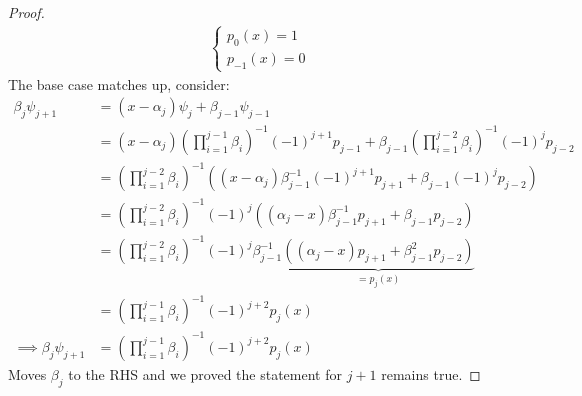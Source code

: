 \documentclass[]{article}
\theoremstyle{definition}
\begin{document}
\begin{appendices}
\begin{proof}
\begin{align}
\begin{cases}
                        p_0(x) = 1 
                        \\
                        p_{-1}(x) = 0
                    \end{cases}
                \end{align}
                The base case matches up, consider: 
                \begin{align}
                    \beta_j\psi_{j + 1} &= (x - \alpha_j)\psi_j + \beta_{j - 1}\psi_{j - 1}
                    \\
                    &= (x - \alpha_j)\left(
                        \prod_{i = 1}^{j - 1}\beta_i
                    \right)^{-1}(-1)^{j + 1}p_{j - 1}
                    + 
                    \beta_{j - 1}\left(
                        \prod_{i = 1}^{j - 2}\beta_i
                    \right)^{-1}(-1)^{j}p_{j - 2}
                    \\
                    &= 
                    \left(
                        \prod_{i = 1}^{j - 2}\beta_i
                    \right)^{-1}
                    \left(
                        (x - \alpha_j)\beta_{j - 1}^{-1}(-1)^{j + 1}p_{j + 1}
                        + 
                        \beta_{j - 1}(-1)^jp_{j -2}
                    \right)
                    \\
                    &= 
                    \left(
                        \prod_{i = 1}^{j - 2}\beta_i
                    \right)^{-1}
                    (-1)^{j}
                    \left(
                        (\alpha_j - x)\beta_{j - 1}^{-1}p_{j + 1}
                        + 
                        \beta_{j - 1}p_{j -2}
                    \right)
                    \\
                    &=
                    \left(
                        \prod_{i = 1}^{j - 2}\beta_i
                    \right)^{-1}
                    (-1)^{j}\beta_{j - 1}^{-1}
                    \underbrace{\left(
                        (\alpha_j - x)p_{j + 1}
                        + 
                        \beta_{j - 1}^2p_{j -2}
                    \right)}_{=p_j(x)}
                    \\
                    &= 
                    \left(
                        \prod_{i = 1}^{j - 1}\beta_i
                    \right)^{-1}(-1)^{j + 2}p_j(x)
                    \\
                    \implies  \beta_j\psi_{j + 1} &= \left(
                        \prod_{i = 1}^{j - 1}\beta_i
                    \right)^{-1}(-1)^{j + 2}p_j(x)
                \end{align}
                Moves $\beta_{j}$ to the RHS and we proved the statement for $j + 1$ remains true. 
            \end{proof}

\end{appendices}
\end{document}
